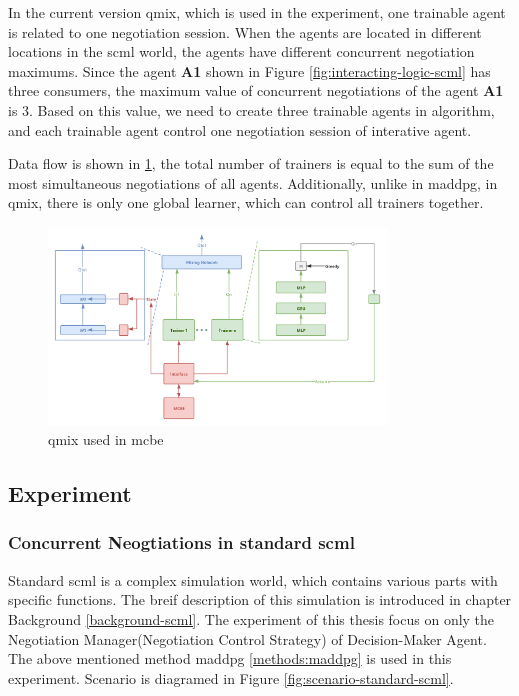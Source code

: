 In the current version \gls{qmix}, which is used in the experiment, one trainable agent is related to one negotiation session. When the agents are located in different locations in the scml world, the agents have different concurrent negotiation maximums. Since the agent \textbf{A1} shown in Figure \ref{fig:interacting-logic-scml} has three consumers, the maximum value of concurrent negotiations of the agent \textbf{A1} is 3. Based on this value, we need to create three trainable agents in algorithm, and each trainable agent control one negotiation session of interative agent.

Data flow is shown in \ref{fig:method-qmix-scml}, the total number of trainers is equal to the sum of the most simultaneous negotiations of all agents. Additionally, unlike in maddpg, in qmix, there is only one global learner, which can control all trainers together.

\begin{figure}[htbp]
\centering
\includegraphics[width=0.80\textwidth]{./images/scml-qmix.png}
\caption{\gls{qmix} used in \gls{mcbe}}
\label{fig:method-qmix-scml}
\end{figure}

\subsection{Experiment}
\subsubsection{Concurrent Neogtiations in standard \gls{scml}}
Standard \gls{scml} is a complex simulation world, which contains various parts with specific functions. The breif description of this simulation is introduced in chapter Background \ref{background-scml}. The experiment of this thesis focus on only the Negotiation Manager(Negotiation Control Strategy) of Decision-Maker Agent. The above mentioned method maddpg \ref{methods:maddpg} is used in this experiment. 
Scenario is diagramed in Figure \ref{fig:scenario-standard-scml}.

